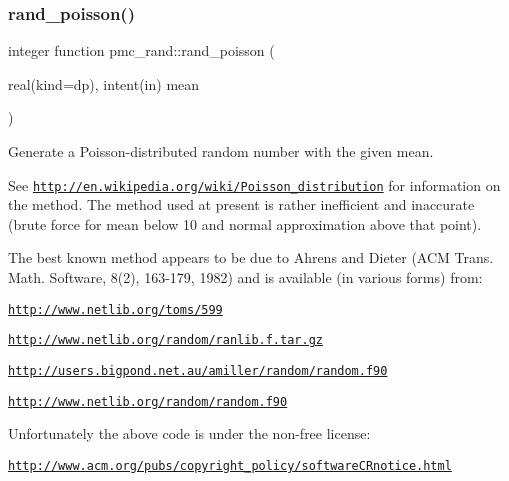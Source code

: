 \mbox{\label{namespacepmc__rand_a815e907dd53313f0bc950a71c72c5bb4}} 
\subsubsection{\texorpdfstring{rand\+\_\+poisson()}{rand\_poisson()}}
{\footnotesize\ttfamily integer function pmc\+\_\+rand\+::rand\+\_\+poisson (\begin{DoxyParamCaption}\item[{real(kind=dp), intent(in)}]{mean }\end{DoxyParamCaption})}



Generate a Poisson-\/distributed random number with the given mean. 

See \href{http://en.wikipedia.org/wiki/Poisson_distribution}{\tt http\+://en.\+wikipedia.\+org/wiki/\+Poisson\+\_\+distribution} for information on the method. The method used at present is rather inefficient and inaccurate (brute force for mean below 10 and normal approximation above that point).

The best known method appears to be due to Ahrens and Dieter (A\+CM Trans. Math. Software, 8(2), 163-\/179, 1982) and is available (in various forms) from\+:
\begin{DoxyItemize}
\item \href{http://www.netlib.org/toms/599}{\tt http\+://www.\+netlib.\+org/toms/599}
\item \href{http://www.netlib.org/random/ranlib.f.tar.gz}{\tt http\+://www.\+netlib.\+org/random/ranlib.\+f.\+tar.\+gz}
\item \href{http://users.bigpond.net.au/amiller/random/random.f90}{\tt http\+://users.\+bigpond.\+net.\+au/amiller/random/random.\+f90}
\item \href{http://www.netlib.org/random/random.f90}{\tt http\+://www.\+netlib.\+org/random/random.\+f90}
\end{DoxyItemize}

Unfortunately the above code is under the non-\/free license\+:
\begin{DoxyItemize}
\item \href{http://www.acm.org/pubs/copyright_policy/softwareCRnotice.html}{\tt http\+://www.\+acm.\+org/pubs/copyright\+\_\+policy/software\+C\+Rnotice.\+html}
\end{DoxyItemize}

